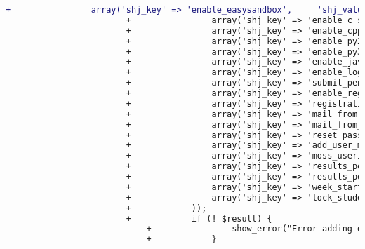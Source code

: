 \begin{lstlisting}[language=diff, caption=Perubahan pada kode Install.php]
						+                array('shj_key' => 'enable_easysandbox',     'shj_value' => '1'),
						+                array('shj_key' => 'enable_c_shield',        'shj_value' => '1'),
						+                array('shj_key' => 'enable_cpp_shield',      'shj_value' => '1'),
						+                array('shj_key' => 'enable_py2_shield',      'shj_value' => '1'),
						+                array('shj_key' => 'enable_py3_shield',      'shj_value' => '1'),
						+                array('shj_key' => 'enable_java_policy',     'shj_value' => '1'),
						+                array('shj_key' => 'enable_log',             'shj_value' => '1'),
						+                array('shj_key' => 'submit_penalty',         'shj_value' => '300'),
						+                array('shj_key' => 'enable_registration',    'shj_value' => '0'),
						+                array('shj_key' => 'registration_code',      'shj_value' => '0'),
						+                array('shj_key' => 'mail_from',              'shj_value' => 'no-reply+shj@labftis.net'),
						+                array('shj_key' => 'mail_from_name',         'shj_value' => 'Judge from FTIS Administrator'),
						+                array('shj_key' => 'reset_password_mail',    'shj_value' => "<p>\nSomeone requested a password reset for your SharIF Judge account at {SITE_URL}.\n</p>\n<p>\nTo change your password, visit this link:\n</p>\n<p>\n<a href=\"{RESET_LINK}\">Reset Password</a>\n</p>\n<p>\nThe link is valid for {VALID_TIME}. If you don't want to change your password, just ignore this email.\n</p>"),
						+                array('shj_key' => 'add_user_mail',          'shj_value' => "<p>\nHello! You are registered in SharIF Judge at {SITE_URL} as {ROLE}.\n</p>\n<p>\nYour username: {USERNAME}\n</p>\n<p>\nYour password: {PASSWORD}\n</p>\n<p>\nYou can log in at <a href=\"{LOGIN_URL}\">{LOGIN_URL}</a>\n</p>"),
						+                array('shj_key' => 'moss_userid',            'shj_value' => ''),
						+                array('shj_key' => 'results_per_page_all',   'shj_value' => '40'),
						+                array('shj_key' => 'results_per_page_final', 'shj_value' => '80'),
						+                array('shj_key' => 'week_start',             'shj_value' => '0'),
						+                array('shj_key' => 'lock_student_display_name',      'shj_value' => '0'),
						+            ));
						+            if (! $result) {
							+                show_error("Error adding data to table ".$this->db->dbprefix('settings'));
							+            }
						
						
						

\end{lstlisting}

